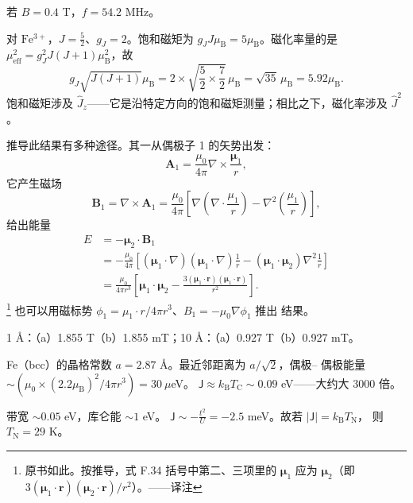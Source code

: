 若 $B=0.4$ T，$f=54.2$ MHz。

 对 $\mathrm{Fe^{3+}}$，$J=\frac{5}{2}$、$g_J=2$。饱和磁矩为
$g_JJ\mu_{\mathrm{B}}=5\mu_{\mathrm{B}}$。磁化率量的是
$\mu_{\mathrm{eff}}^{2}=g_J^{2}J(J+1)\mu_{\mathrm{B}}^{2}$，故
\begin{equation*}
g_J\sqrt{J(J+1)}\mu_{\mathrm{B}} = 2\times\sqrt{\frac{5}{2}\times\frac{7}{2}}\,\mu_{\mathrm{B}} = \sqrt{35}\,\mu_{\mathrm{B}} = 5.92\mu_{\mathrm{B}}.\tag{F.31}
\end{equation*}
饱和磁矩涉及 $\hat{J}_z$——它是沿特定方向的饱和磁矩测量；相比之下，磁化率涉及
$\hat{J}^{2}$。

 推导此结果有多种途径。其一从偶极子 1 的矢势出发：
\begin{equation*}
\mathbf{A}_1 = \frac{\mu_0}{4\pi}\nabla\times\frac{\boldsymbol{\mu}_1}{r},\tag{F.32}
\end{equation*}
它产生磁场
\begin{equation*}
\mathbf{B}_1 = \nabla\times\mathbf{A}_1 = \frac{\mu_0}{4\pi}\left[\nabla\left(\nabla\cdot\frac{\mu_1}{r}\right) - \nabla^{2}\left(\frac{\mu_1}{r}\right)\right],\tag{F.33}
\end{equation*}
给出能量
\begin{align*}
E &= -\boldsymbol{\mu}_2\cdot\mathbf{B}_1\\
&= -\frac{\mu_0}{4\pi}\left[(\boldsymbol{\mu}_1\cdot\nabla)(\boldsymbol{\mu}_1\cdot\nabla)\frac{1}{r} - (\boldsymbol{\mu}_1\cdot\boldsymbol{\mu}_2)\nabla^{2}\frac{1}{r}\right]\\
&= \frac{\mu_0}{4\pi r^{3}}\left[\boldsymbol{\mu}_1\cdot\boldsymbol{\mu}_2 - \frac{3(\boldsymbol{\mu}_1\cdot\mathbf{r})(\boldsymbol{\mu}_1\cdot\mathbf{r})}{r^{2}}\right].\tag{F.34}
\end{align*}
\footnote{原书如此。按推导，式 F.34 括号中第二、三项里的 $\boldsymbol{\mu}_1$
应为 $\boldsymbol{\mu}_2$（即 $3(\boldsymbol{\mu}_1\cdot\mathbf{r})(\boldsymbol{\mu}_2\cdot\mathbf{r})/r^{2}$）。——译注}
也可以用磁标势 $\phi_1=\mu_1\cdot r/4\pi r^{3}$、$B_1=-\mu_0\nabla\phi_1$ 推出
结果。

 1 \AA：（a）1.855 T（b）1.855 mT；10 \AA：（a）0.927 T（b）0.927 mT。

 Fe（bcc）的晶格常数 $a=2.87$ \AA。最近邻距离为 $a/\sqrt{2}$，偶极--
偶极能量 $\sim(\mu_0\times(2.2\mu_{\text{B}})^{2}/4\pi r^{3})=30\ \mu$eV。
$\mathsf{J}\approx k_{\text{B}}T_{\text{C}}\sim0.09$ eV——大约大 3000 倍。

 带宽 $\sim0.05$ eV，库仑能 $\sim1$ eV。
$\mathsf{J}\sim-\frac{t^{2}}{U}=-2.5$ meV。故若 $|\mathsf{J}|=k_{\mathrm{B}}T_{\mathrm{N}}$，
则 $T_{\mathrm{N}}=29$ K。

